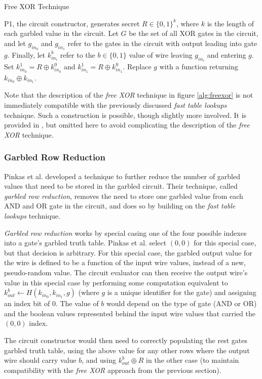 \begin{algorithm}[H]
    \caption{Free XOR Technique}
    \label{alg:freexor}
    \begin{algorithmic}[1]
        \STATE \ac{P1}, the circuit constructor, generates secret $R \in \{0, 1\}^{k}$, where $k$ is the length of each garbled value in the circuit.
        \STATE Let $G$ be the set of all XOR gates in the circuit, and let $g_{in_0}$ and $g_{in_1}$ refer to the gates in the circuit with output leading into gate $g$. Finally, let $k^b_{in_i}$ refer to the $b \in \{0, 1\}$ value of wire leaving $g_{in_i}$ and entering $g$.
            \STATE Set $k^1_{in_0} =  R \oplus k^0_{in_0}$ and $k^1_{in_1} =  R \oplus k^0_{in_1}$.
            \STATE Replace $g$ with a function returning $k_{in_0} \oplus k_{in_1}$.
        \ENDFOR
    \end{algorithmic}
\end{algorithm}

Note that the description of the \emph{free XOR} technique in figure \ref{alg:freexor} is not immediately compatible with the previously discussed \emph{fast table lookups} technique.  Such a construction is possible, though slightly more involved.  It is provided in \cite{kreuter2012billion}, but omitted here to avoid complicating the description of the \emph{free XOR} technique.


\subsubsection{Garbled Row Reduction}
\label{sec:grr}

Pinkas et al.\cite{pinkas2009secure} developed a technique to further reduce the number of garbled values that need to be stored in the garbled circuit.  Their technique, called \emph{garbled row reduction}, removes the need to store one garbled value from each AND and OR gate in the circuit, and does so by building on the \emph{fast table lookups} technique.

\emph{Garbled row reduction} works by special casing one of the four possible indexes into a gate's garbled truth table.  Pinkas et al. select $(0, 0)$ for this special case, but that decision is arbitrary.  For this special case, the garbled output value for the wire is defined to be a function of the input wire values, instead of a new, pseudo-random value. The circuit evaluator can then receive the output wire's value in this special case by performing some computation equivalent to $k^b_{out} \gets H(k_{in_0}, k_{in_1}, g)$ (where $g$ is a unique identifier for the gate) and assigning an index bit of 0. The value of $b$ would depend on the type of gate (AND or OR) and the boolean values represented behind the input wire values that carried the $(0, 0)$ index.

The circuit constructor would then need to correctly populating the rest gates garbled truth table, using the above value for any other rows where the output wire should carry value $b$, and using $k^b_{out} \oplus R$ in the other case (to maintain compatibility with the \emph{free XOR} approach from the previous section).
